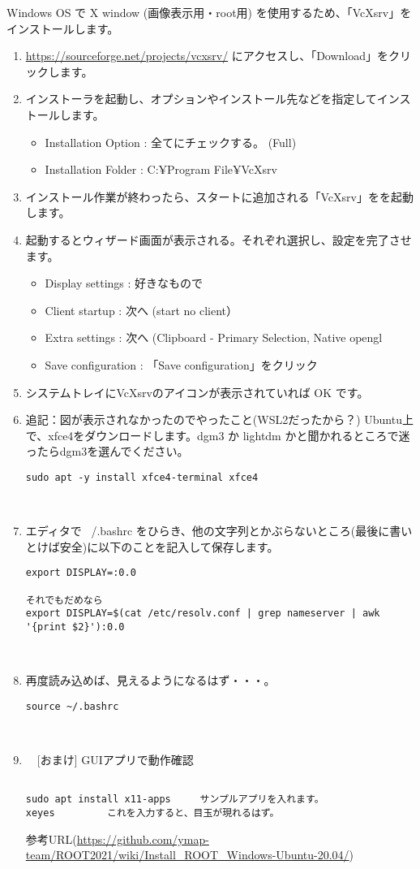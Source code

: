Windows OS で X window (画像表示用・root用) を使用するため、「VcXsrv」をインストールします。
\begin{enumerate}
  \item \url{https://sourceforge.net/projects/vcxsrv/} にアクセスし、「Download」をクリックします。
  \item インストーラを起動し、オプションやインストール先などを指定してインストールします。
        \begin{itemize}
          \item Installation Option : 全てにチェックする。 (Full)
          \item Installation Folder : C:¥Program File¥VcXsrv
        \end{itemize}
  \item インストール作業が終わったら、スタートに追加される「VcXsrv」をを起動します。
  \item 起動するとウィザード画面が表示される。それぞれ選択し、設定を完了させます。
        \begin{itemize}
          \item Display settings : 好きなもので
          \item Client startup : 次へ (start no client）
          \item Extra settings : 次へ (Clipboard - Primary Selection, Native opengl
          \item Save configuration : 「Save configuration」をクリック
        \end{itemize}
  \item システムトレイにVcXsrvのアイコンが表示されていれば OK です。

  \item 追記：図が表示されなかったのでやったこと(WSL2だったから？) Ubuntu上で、xfce4をダウンロードします。dgm3 か lightdm かと聞かれるところで迷ったらdgm3を選んでください。
\begin{lstlisting}
sudo apt -y install xfce4-terminal xfce4
\end{lstlisting}
　\item エディタで ~/.bashrc をひらき、他の文字列とかぶらないところ(最後に書いとけば安全)に以下のことを記入して保存します。
\begin{lstlisting}
export DISPLAY=:0.0

それでもだめなら
export DISPLAY=$(cat /etc/resolv.conf | grep nameserver | awk '{print $2}'):0.0
\end{lstlisting}
　\item 再度読み込めば、見えるようになるはず・・・。
\begin{lstlisting}
source ~/.bashrc
\end{lstlisting}
　\item　[おまけ] GUIアプリで動作確認
\begin{lstlisting}　　　　
sudo apt install x11-apps     サンプルアプリを入れます。
xeyes         これを入力すると、目玉が現れるはず。
\end{lstlisting}

参考URL(\url{https://github.com/ymap-team/ROOT2021/wiki/Install_ROOT_Windows-Ubuntu-20.04/})
\end{enumerate}


